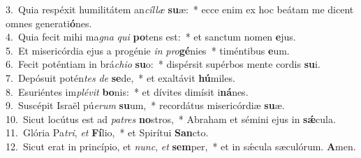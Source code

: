 {3.~}Quia respéxit humilitátem an\textit{cíl}\textit{læ} \textbf{su}æ:~* ecce enim ex hoc beátam me dicent omnes generati\textbf{ó}nes.\\
{4.~}Quia fecit mihi ma\textit{gna} \textit{qui} \textbf{po}tens est:~* et sanctum nomen \textbf{e}jus.\\
{5.~}Et misericórdia ejus a progénie \textit{in} \textit{pro}\textbf{gé}nies~* timéntibus \textbf{e}um.\\
{6.~}Fecit poténtiam in brá\textit{chi}\textit{o} \textbf{su}o:~* dispérsit supérbos mente cordis \textbf{su}i.\\
{7.~}Depósuit potén\textit{tes} \textit{de} \textbf{se}de,~* et exaltávit \textbf{hú}miles.\\
{8.~}Esuriéntes im\textit{plé}\textit{vit} \textbf{bo}nis:~* et dívites dimísit i\textbf{ná}nes.\\
{9.~}Suscépit Israël pú\textit{e}\textit{rum} \textbf{su}um,~* recordátus misericórdiæ \textbf{su}æ.\\
{10.~}Sicut locútus est ad \textit{pa}\textit{tres} \textbf{no}stros,~* Abraham et sémini ejus in \textbf{sǽ}cula.\\
{11.~}Glória Pa\textit{tri}, \textit{et} \textbf{Fí}lio,~* et Spirítui \textbf{San}cto.\\
{12.~}Sicut erat in princípio, et \textit{nunc}, \textit{et} \textbf{sem}per,~* et in sǽcula sæculórum. \textbf{A}men.\\
